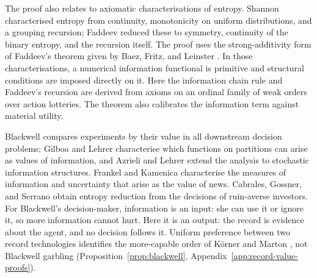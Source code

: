 \documentclass[11pt,a4paper]{article}
\theoremstyle{definition}
\newcommand{\1}{\mathbf 1}
\begin{document}
The proof also relates to axiomatic characterisations of entropy.  Shannon \cite{Shannon1948} characterised
entropy from continuity, monotonicity on uniform distributions, and a grouping recursion; Faddeev
\cite{Faddeev1956} reduced these to symmetry, continuity of the binary entropy, and the recursion itself.  The
proof uses the strong-additivity form of Faddeev's theorem given by Baez, Fritz, and Leinster
\cite{BaezFritzLeinster2011}.
In those characterisations, a numerical information functional is primitive and structural conditions are
imposed directly on it. Here the information chain rule and Faddeev's recursion are derived from axioms on an ordinal family of weak orders over action lotteries. The theorem also calibrates the information term against material utility.

Blackwell \cite{Blackwell1953} compares experiments by their value in all downstream decision problems; Gilboa
and Lehrer \cite{GilboaLehrer1991} characterise which functions on partitions can arise as values of information, and Azrieli and Lehrer \cite{AzrieliLehrer2008} extend the analysis to stochastic
information structures.  Frankel and Kamenica \cite{FrankelKamenica2019} characterise the measures of
information and uncertainty that arise as the value of news.  Cabrales, Gossner, and
Serrano \cite{CabralesGossnerSerrano2013} obtain entropy reduction from the decisions of ruin-averse investors.
For Blackwell's decision-maker, information is an input: she can use it or ignore it, so more
information cannot hurt.  Here it is an output: the record is evidence about the agent, and no
decision follows it.
Uniform preference between two record technologies identifies the more-capable
order of K\"orner and Marton \cite{KornerMarton1977}, not Blackwell garbling
(Proposition~\ref{prop:blackwell}, Appendix~\ref{app:record-value-proofs}).
\end{document}
